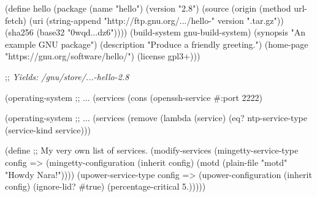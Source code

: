 \documentclass{beamer}
\begin{document}
\begin{frame}[fragile]
  \begin{semiverbatim}
    \small{
(define hello
  (\alert{package}
    (name "hello")
    (version "2.8")
    (source (\alert{origin}
              (method url-fetch)
              (uri (string-append
                    "http://ftp.gnu.org/\textrm{...}/hello-" version
                    ".tar.gz"))
              (sha256 (base32 "0wqd\textrm{...}dz6"))))
    (\alert{build-system} gnu-build-system)
    (synopsis "An example GNU package")
    (description "Produce a friendly greeting.")
    (home-page "https://gnu.org/software/hello/")
    (license gpl3+)))

;; \textsl{Yields: /gnu/store/\textrm{...}-hello-2.8}
}
  \end{semiverbatim}
\end{frame}

\begin{frame}[fragile]
  \begin{semiverbatim}
(\alert{operating-system}
  ;; \textrm{...}
  (services (cons (openssh-service #:port 2222)
  \end{semiverbatim}
\end{frame}

\begin{frame}[fragile]
  \begin{semiverbatim}
(\alert{operating-system}
  ;; \textrm{...}
  (services (remove (lambda (service)
                      (eq? ntp-service-type
                           (service-kind service)))
  \end{semiverbatim}
\end{frame}

\begin{frame}[fragile]
  \begin{semiverbatim}
(\alert{define} %
  ;; My very own list of services.
  (\alert{modify-services} %
    (mingetty-service-type config =>
                           (mingetty-configuration
                            (\alert{inherit} config)
                            (motd (plain-file "motd"
                                     "Howdy Nara!"))))
    (upower-service-type config =>
                         (upower-configuration
                          (\alert{inherit} config)
                          (ignore-lid? #true)
                          (percentage-critical 5.)))))
  \end{semiverbatim}
\end{frame}
\end{document}
